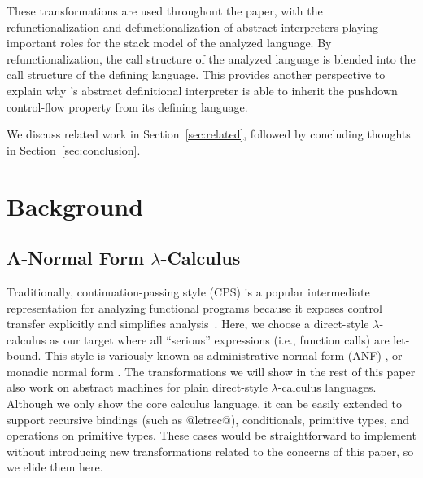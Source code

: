 \documentclass[acmsmall, review]{acmart}\settopmatter{}
\begin{document}
These transformations are used throughout the paper, with the refunctionalization and
defunctionalization of abstract interpreters playing important roles for the stack model of
the analyzed language. By refunctionalization, the call structure of the analyzed language
is blended into the call structure of the defining language. This provides another perspective to
explain why \citeauthor{darais2017abstracting}'s abstract definitional interpreter
is able to inherit the pushdown control-flow property from its defining language.

We discuss related work in Section~\ref{sec:related}, followed by
concluding thoughts in Section~\ref{sec:conclusion}.

\iffalse
\subsection{Style}

We use Scala language to demonstrate the idea and each step of transformations.
We expect that readers have moderate familiarity to Scala's syntax, such as
case classes, pattern matching and for comprehension.

There are two main reasons we use a real-world language:
1) The code does not diminish the accuracy of the material than formal and mathematical
notations, which are heavily used in other static analysis or semantics papers.
The Scala code in this paper can be easily back-translated into formal notations.
2) As a functional pearl, the code in this paper is executable with only few changes,
which make it particularly fit for presenting syntactic transformations on abstract
interpreters.
\fi

\section{Background} \label{background}

\subsection{A-Normal Form $\lambda$-Calculus} \label{anfsyntax}

Traditionally, continuation-passing style (CPS) is a popular intermediate representation
for analyzing functional programs because it exposes control transfer explicitly and 
simplifies analysis~\cite{Shivers:1991:SSC:115865.115884, Shivers:1988:CFA:53990.54007}.
Here, we choose a direct-style $\lambda$-calculus as our target where all ``serious'' 
expressions (i.e., function calls) are let-bound. This style is variously known as 
administrative normal form (ANF) \cite{flanagan1993essence}, or monadic normal 
form \cite{moggi1991notions,DBLP:conf/cc/Danvy03}. The transformations 
we will show in the rest of this paper also work on abstract machines for plain 
direct-style $\lambda$-calculus languages. Although we only show the core calculus language,
it can be easily extended to support recursive bindings (such as @letrec@), conditionals, 
primitive types, and operations on primitive types. These cases would be straightforward to
implement without introducing new transformations related to the concerns of this paper,
so we elide them here.
\end{document}
